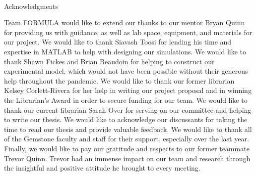 
\renewcommand{\baselinestretch}{2}
\small\normalsize
\hbox{\ }
 
\vspace{.5in}

\begin{center}
\large{Acknowledgments} 
\end{center} 

\vspace{1ex}

Team FORMULA would like to extend our thanks to our mentor Bryan Quinn for providing us with guidance, as well as lab space, equipment, and materials for our project. We would like to thank Siavash Toosi for lending his time and expertise in MATLAB to help with designing our simulations. We would like to thank Shawn Fickes and Brian Beaudoin for helping to construct our experimental model, which would not have been possible without their generous help throughout the pandemic. We would like to thank our former librarian Kelsey Corlett-Rivera for her help in writing our project proposal and in winning the Librarian’s Award in order to secure funding for our team. We would like to thank our current librarian Sarah Over for serving on our committee and helping to write our thesis. We would like to acknowledge our discussants for taking the time to read our thesis and provide valuable feedback. We would like to thank all of the Gemstone faculty and staff for their support, especially over the last year. Finally, we would like to pay our gratitude and respects to our former teammate Trevor Quinn. Trevor had an immense impact on our team and research through the insightful and positive attitude he brought to every meeting.

